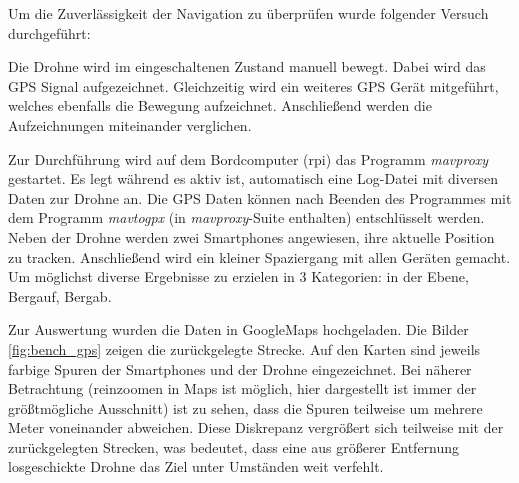 Um die Zuverlässigkeit der Navigation zu überprüfen wurde folgender Versuch durchgeführt:
\hspace{3cm}\begin{minipage}{\textwidth}
Die Drohne wird im eingeschaltenen Zustand manuell bewegt. Dabei wird das GPS Signal aufgezeichnet. Gleichzeitig wird ein weiteres GPS Gerät mitgeführt, welches ebenfalls die Bewegung aufzeichnet. Anschließend werden die Aufzeichnungen miteinander verglichen.
\end{minipage}

Zur Durchführung wird auf dem Bordcomputer (\gls{rpi}) das Programm \textit{mavproxy} gestartet. Es legt während es aktiv ist, automatisch eine Log-Datei mit diversen Daten zur Drohne an. Die GPS Daten können nach Beenden des Programmes mit dem Programm \textit{mavtogpx} (in \textit{mavproxy}-Suite enthalten) entschlüsselt werden. Neben der Drohne werden zwei Smartphones angewiesen, ihre aktuelle Position zu tracken. Anschließend wird ein kleiner Spaziergang mit allen Geräten gemacht. Um möglichst diverse Ergebnisse zu erzielen in 3 Kategorien: in der Ebene, Bergauf, Bergab.

Zur Auswertung wurden die Daten in GoogleMaps hochgeladen. Die Bilder \ref{fig:bench_gps} zeigen die zurückgelegte Strecke. Auf den Karten sind jeweils farbige Spuren der Smartphones und der Drohne eingezeichnet. Bei näherer Betrachtung (reinzoomen in Maps ist möglich, hier dargestellt ist immer der größtmögliche Ausschnitt) ist zu sehen, dass die Spuren teilweise um mehrere Meter voneinander abweichen. Diese Diskrepanz vergrößert sich teilweise mit der zurückgelegten Strecken, was bedeutet, dass eine aus größerer Entfernung losgeschickte Drohne das Ziel unter Umständen weit verfehlt.

